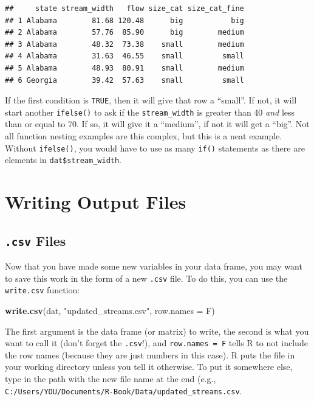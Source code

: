 \documentclass[]{book}
\newenvironment{Shaded}{\begin{snugshade}}{\end{snugshade}}
\newcommand{\KeywordTok}[1]{\textcolor[rgb]{0.13,0.29,0.53}{\textbf{#1}}}
\newcommand{\DataTypeTok}[1]{\textcolor[rgb]{0.13,0.29,0.53}{#1}}
\newcommand{\StringTok}[1]{\textcolor[rgb]{0.31,0.60,0.02}{#1}}
\newcommand{\NormalTok}[1]{#1}
\theoremstyle{definition}
\theoremstyle{definition}
\theoremstyle{definition}
\theoremstyle{remark}
\begin{document}
\begin{verbatim}
##     state stream_width   flow size_cat size_cat_fine
## 1 Alabama        81.68 120.48      big           big
## 2 Alabama        57.76  85.90      big        medium
## 3 Alabama        48.32  73.38    small        medium
## 4 Alabama        31.63  46.55    small         small
## 5 Alabama        48.93  80.91    small        medium
## 6 Georgia        39.42  57.63    small         small
\end{verbatim}

If the first condition is \texttt{TRUE}, then it will give that row a
``small''. If not, it will start another \texttt{ifelse()} to ask if the
\texttt{stream\_width} is greater than 40 \emph{and} less than or equal
to 70. If so, it will give it a ``medium'', if not it will get a
``big''. Not all function nesting examples are this complex, but this is
a neat example. Without \texttt{ifelse()}, you would have to use as many
\texttt{if()} statements as there are elements in
\texttt{dat\$stream\_width}.

\section{Writing Output Files}\label{writing-output-files}

\subsection{\texorpdfstring{\texttt{.csv}
Files}{.csv Files}}\label{csv-files}

Now that you have made some new variables in your data frame, you may
want to save this work in the form of a new \texttt{.csv} file. To do
this, you can use the \texttt{write.csv} function:

\begin{Shaded}
\begin{Highlighting}[]
\KeywordTok{write.csv}\NormalTok{(dat, }\StringTok{"updated_streams.csv"}\NormalTok{, }\DataTypeTok{row.names =}\NormalTok{ F)}
\end{Highlighting}
\end{Shaded}

The first argument is the data frame (or matrix) to write, the second is
what you want to call it (don't forget the \texttt{.csv}!), and
\texttt{row.names\ =\ F} tells R to not include the row names (because
they are just numbers in this case). R puts the file in your working
directory unless you tell it otherwise. To put it somewhere else, type
in the path with the new file name at the end (e.g.,
\texttt{C:/Users/YOU/Documents/R-Book/Data/updated\_streams.csv}.
\end{document}
